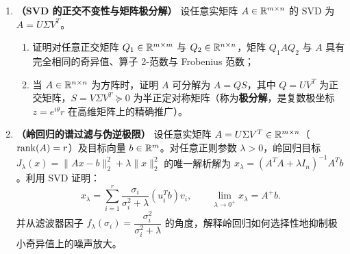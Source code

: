 \begin{enumerate}[label=\textbf{4.\arabic*}, leftmargin=2.4em, resume]
  \item \textbf{（SVD 的正交不变性与矩阵极分解）} 设任意实矩阵 $A \in \mathbb{R}^{m\times n}$ 的 SVD 为 $A = U\Sigma V^T$。
  \begin{enumerate}[label=(\arabic*), leftmargin=1.8em]
    \item 证明对任意正交矩阵 $Q_1 \in \mathbb{R}^{m\times m}$ 与 $Q_2 \in \mathbb{R}^{n\times n}$，矩阵 $Q_1 A Q_2$ 与 $A$ 具有完全相同的奇异值、算子 2-范数与 Frobenius 范数；
    \item 当 $A \in \mathbb{R}^{n\times n}$ 为方阵时，证明 $A$ 可分解为 $A = Q S$，其中 $Q = U V^T$ 为正交矩阵，$S = V\Sigma V^T \succeq 0$ 为半正定对称矩阵（称为\textbf{极分解}，是复数极坐标 $z = e^{i\theta}r$ 在高维矩阵上的精确推广）。
  \end{enumerate}

  \item \textbf{（岭回归的谱过滤与伪逆极限）} 设任意实矩阵 $A = U\Sigma V^T \in \mathbb{R}^{m\times n}$（$\operatorname{rank}(A) = r$）及目标向量 $b \in \mathbb{R}^m$。对任意正则参数 $\lambda > 0$，岭回归目标 $J_\lambda(x) = \|Ax - b\|_2^2 + \lambda\|x\|_2^2$ 的唯一解析解为 $x_\lambda = (A^T A + \lambda I_n)^{-1} A^T b$。利用 SVD 证明：
  \[
    x_\lambda = \sum_{i=1}^r \frac{\sigma_i}{\sigma_i^2 + \lambda}(u_i^T b) v_i,
    \qquad \lim_{\lambda \to 0^+} x_\lambda = A^+ b.
  \]
  并从滤波器因子 $f_\lambda(\sigma_i) = \dfrac{\sigma_i^2}{\sigma_i^2 + \lambda}$ 的角度，解释岭回归如何选择性地抑制极小奇异值上的噪声放大。
\end{enumerate}


